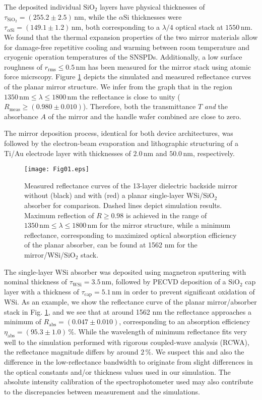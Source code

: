 \documentclass[aip,apl,showpacs,showkeys,preprint,superscriptaddress,preprintnumbers,amsmath,amssymb]{revtex4-1}
\begin{document}
\begin{bibunit}
The deposited individual $\mathrm{SiO}_2$ layers have physical thicknesses of $\tau_{\mathrm{SiO}_2}=(255.2\pm2.5)\,\mathrm{nm}$, while the $\alpha\mathrm{Si}$ thicknesses were $\tau_{\alpha\mathrm{Si}}=(149.1\pm1.2)\,\mathrm{nm}$, both corresponding to a $\lambda/4$ optical stack at $1550\,\mathrm{nm}$. We found that the thermal expansion properties of the two mirror materials allow for damage-free repetitive cooling and warming between room temperature and cryogenic operation temperatures of the SNSPDs. Additionally, a low surface roughness of $r_\mathrm{rms}\le0.5\,\mathrm{nm}$ has been measured for the mirror stack using atomic force micrscopy. Figure \ref{fig:01} depicts the simulated and measured reflectance curves of the planar mirror structure. We infer from the graph that in the region $1350\,\mathrm{nm}\le\lambda\le1800\,\mathrm{nm}$ the reflectance is close to unity ($R_\mathrm{meas}\ge(0.980\pm0.010)$). Therefore, both the transmittance $T$ \textit{and} the absorbance $A$ of the mirror and the handle wafer combined are close to zero. 

The mirror deposition process, identical for both device architectures, was followed by the electron-beam evaporation and lithographic structuring of a Ti/Au electrode layer with thicknesses of $2.0\,\mathrm{nm}$ and $50.0\,\mathrm{nm}$, respectively. 

\begin{figure}
\texttt{[image: Fig01.eps]}
\caption{\label{fig:01} Measured reflectance curves of the 13-layer dielectric backside mirror without (black) and with (red) a planar single-layer WSi/$\mathrm{SiO}_2$ absorber for comparison. Dashed lines depict simulation results. Maximum reflection of $R\ge0.98$ is achieved in the range of $1350\,\mathrm{nm}\le\lambda\le1800\,\mathrm{nm}$ for the mirror structure, while a minimum reflectance, corresponding to maximized optical absorption efficiency of the planar absorber, can be found at 1562 nm for the mirror/WSi/$\mathrm{SiO}_2$ stack.}
\end{figure}

The single-layer WSi absorber was deposited using magnetron sputtering with nominal thickness of $\tau_{\mathrm{WSi}}=3.5\,\mathrm{nm}$, followed by PECVD deposition of a $\mathrm{SiO}_2$ cap layer with a thickness of $\tau_{\mathrm{cap}}=5.1\,\mathrm{nm}$ in order to prevent significant oxidation of WSi. As an example, we show the reflectance curve of the planar mirror/absorber stack in Fig. \ref{fig:01}, and we see that at around 1562 nm the reflectance approaches a minimum of $R_\mathrm{abs}=(0.047\pm0.010)$, corresponding to an absorption efficiency $\eta_\mathrm{abs}=(95.3\pm1.0)\,\%$. While the wavelength of minimum reflectance fits very well to the simulation performed with rigorous coupled-wave analysis (RCWA\cite{Moharam1981,Li2016}), the reflectance magnitude differs by around $2\,\%$. We suspect this and also the difference in the low-reflectance bandwidth to originate from slight differences in the optical constants and/or thickness values  used in our simulation. The absolute intensity calibration of the spectrophotometer used may also contribute to the discrepancies between measurement and the simulations.


\end{bibunit}
\end{document}
